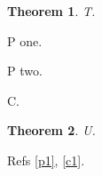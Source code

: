 \documentclass{elsarticle}
\newtheorem{thm}{Theorem}
\begin{document}
\begin{thm}\label{t1} T. \end{thm}
\begin{pf}\label{p1} P one. \end{pf}
\begin{pot} P two. \end{pot}
\begin{clm}\label{c1} C. \end{clm}
\begin{thm} U. \end{thm}
Refs \ref{p1}, \ref{c1}.
\end{document}
